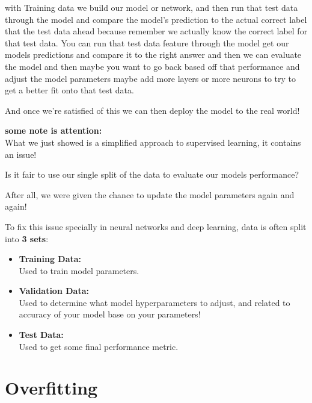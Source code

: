 \documentclass[12pt]{article}
\begin{document}
with Training data we build our model or network, and then run that test data through the model and compare the model's prediction to the actual correct label that the test data ahead because remember we actually know the correct label for that test data. 
You can run that test data feature through the model get our models predictions and compare it to the right answer and then we can evaluate the model and then maybe you want to go back based off that performance and adjust the model parameters maybe add more layers or more neurons to try to get a better fit onto that test data.

And once we're satisfied of this we can then deploy the model to the real world!


\textbf{some note is attention: }\\
What we just showed is a simplified approach to supervised learning, it contains an issue!

Is it fair to use our single split of the data to evaluate our models performance?

After all, we were given the chance to update the model parameters again and again!

\large To fix this issue specially in neural networks and deep learning, data is often split into \textbf{3 sets}:
\small
\begin{itemize}
	\item
	\textbf{Training Data:}\\
	Used to train model parameters.
	
	\item 
	\textbf{Validation Data:}\\
	Used to determine what model hyperparameters to adjust, and related to accuracy of your model base on your parameters!
	
	\item
	\textbf{Test Data:}\\
	Used to get some final performance metric.
	
\end{itemize}

\section{Overfitting}
\end{document}
